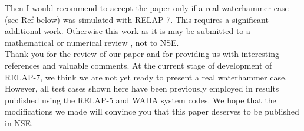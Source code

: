 \documentclass{article}
\begin{document}
\bigskip

{\color{blue}
Then I would recommend to accept the paper only if a real waterhammer case (see Ref below) was simulated with RELAP-7. This requires a significant additional work.
Otherwise this work as it is may be submitted to a mathematical or numerical review , not to NSE. \\
}
Thank you for the review of our paper and for providing us with interesting references and valuable comments. At the current stage of development of RELAP-7, we think we are not yet ready to present a real waterhammer case. However, all test cases shown here have been previously employed in results published using the RELAP-5 and WAHA system codes. We hope that the modifications we made will convince you that this paper deserves to be published in NSE.
\end{document}
